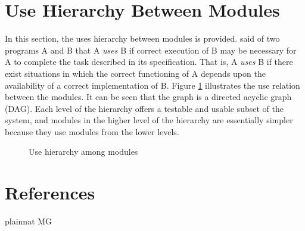 \documentclass[12pt, titlepage]{article}
\newcommand{\newSection}[1]{
  \newpage
  \section{#1}
}
\begin{document}
\newSection{Use Hierarchy Between Modules} \label{SecUse}

In this section, the uses hierarchy between modules is
provided. \citet{Parnas1978} said of two programs A and B that A {\em uses} B if
correct execution of B may be necessary for A to complete the task described in
its specification. That is, A {\em uses} B if there exist situations in which
the correct functioning of A depends upon the availability of a correct
implementation of B.  Figure \ref{FigUH} illustrates the use relation between
the modules. It can be seen that the graph is a directed acyclic graph
(DAG). Each level of the hierarchy offers a testable and usable subset of the
system, and modules in the higher level of the hierarchy are essentially simpler
because they use modules from the lower levels.

\begin{figure}[H]
\centering
\caption{Use hierarchy among modules}
\label{FigUH}
\end{figure}

\newSection{References}

 {plainnat}
 {MG}
\end{document}
